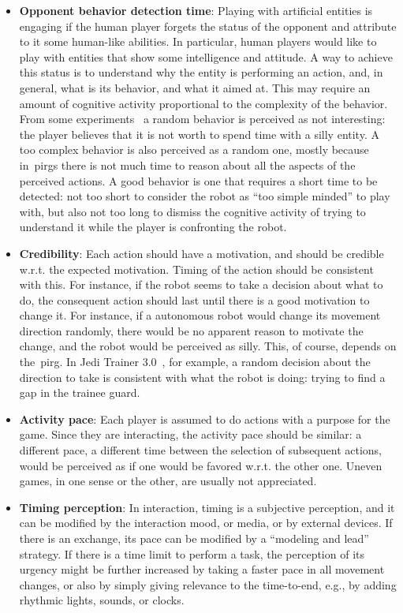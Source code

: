 \begin{itemize}
\item \textbf{Opponent behavior detection time}: Playing with artificial entities is engaging if the human player forgets the status of the opponent and attribute to it some human-like abilities. In particular, human players would like to play with entities that show some intelligence and attitude. A way to achieve this status is to understand why the entity is performing an action, and, in general, what is its behavior, and what it aimed at. This may require an amount of cognitive activity proportional to the complexity of the behavior. From some experiments~\citep{martinoia_physically_2013} a random behavior is perceived as not interesting: the player believes that it is not worth to spend time with a silly entity. A too complex behavior is also perceived as a random one, mostly because in~\gls{pirg}s there is not much time to reason about all the aspects of the perceived actions. A good behavior is one that requires a short time to be detected: not too short to consider the robot as ``too simple minded'' to play with, but also not too long to dismiss the cognitive activity of trying to understand it while the player is confronting the robot.

\item \textbf{Credibility}: Each action should have a motivation, and should be credible w.r.t. the expected motivation. Timing of the action should be consistent with this. For instance, if the robot seems to take a decision about what to do, the consequent action should last until there is a good motivation to change it. For instance, if a autonomous robot would change its movement direction randomly, there would be no apparent reason to motivate the change, and the robot would be perceived as silly. This, of course, depends on the~\gls{pirg}. In Jedi Trainer 3.0~\citep{martinoia_physically_2013}, for example, a random decision about the direction to take is consistent with what the robot is doing: trying to find a gap in the trainee guard.

\item \textbf{Activity pace}: Each player is assumed to do actions with a purpose for the game. Since they are interacting, the activity pace should be similar: a different pace, a different time between the selection of subsequent actions, would be perceived as if one would be favored w.r.t. the other one. Uneven games, in one sense or the other, are usually not appreciated.

\item \textbf{Timing perception}: In interaction, timing is a subjective perception, and it can be modified by the interaction mood, or media, or by external devices. If there is an exchange, its pace can be modified by a ``modeling and lead'' strategy. If there is a time limit to perform a task, the perception of its urgency might be further increased by taking a faster pace in all movement changes, or also by simply giving relevance to the time-to-end, e.g., by adding rhythmic lights, sounds, or clocks.
\end{itemize}

